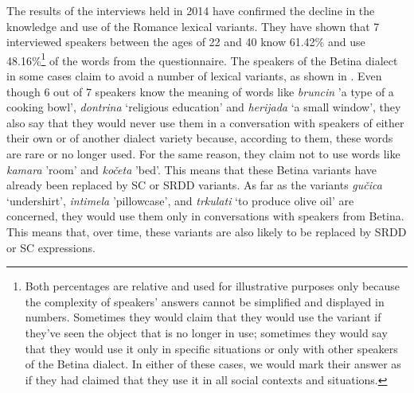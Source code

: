 \documentclass[output=paper]{LSP/langsci}
\begin{document}
The results of the interviews held in 2014 have confirmed the decline in the knowledge and use of the Romance lexical variants. They have shown that 7 interviewed speakers between the ages of 22 and 40 know 61.42\% and use 48.16\%\footnote{Both percentages are relative and used for illustrative purposes only because the complexity of speakers’ answers cannot be simplified and displayed in numbers. Sometimes they would claim that they would use the variant if they’ve seen the object that is no longer in use; sometimes they would say that they would use it only in specific situations or only with other speakers of the Betina dialect. In either of these cases, we would mark their answer as if they had claimed that they use it in all social contexts and situations.} of the words from the questionnaire. The speakers of the Betina dialect in some cases claim to avoid a number of lexical variants, as shown in . Even though 6 out of 7 speakers know the meaning of words like \textit{bruncin} 'a type of a cooking bowl', \textit{dontrina} ‘religious education’ and \textit{herijada} ‘a small window’, they also say that they would never use them in a conversation with speakers of either their own or of another dialect variety because, according to them, these words are rare or no longer used. For the same reason, they claim not to use words like \textit{kamara} 'room' and \textit{kočeta} 'bed'. This means that these Betina variants have already been replaced by SC or SRDD variants. As far as the variants \textit{gučica} ‘undershirt’, \textit{intimela} 'pillowcase', and \textit{trkulati} ‘to produce olive oil’ are concerned, they would use them only in conversations with speakers from Betina. This means that, over time, these variants are also likely to be replaced by SRDD or SC expressions. 
\end{document}

